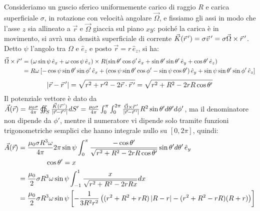 Consideriamo un guscio sferico uniformemente carico di raggio $ R $ e carica superficiale $ \sigma $, in rotazione con velocità angolare $ \vec{\Omega} $, e fissiamo gli assi in modo che l'asse $ z $ sia allineato a $ \vec{r} $ e $ \vec{\Omega} $ giaccia sul piano $ xy $: poiché la carica è in movimento, si avrà una densità superficiale di corrente $ \vec{K}(\vec{r}\,') = \sigma\vec{v}\,' = \sigma\vec{\Omega}\times\vec{r}\,' $. \\ 
%
Detto $ \psi $ l'angolo tra $ \Omega $ e $ \hat{e}_z $ e posto $ \vec{r} = r\,\hat{e}_z $, si ha:
\begin{equation}
	\begin{split}
		\vec{\Omega}\times\vec{r}\,' &= (\omega \sin\psi \,\hat{e}_x + \omega \cos\psi \,\hat{e}_z) \times R (\sin\theta'\cos\phi' \,\hat{e}_x + \sin\theta'\sin\theta' \,\hat{e}_y + \cos\theta' \,\hat{e}_z) \\ 
				     &= R\omega \left[-\cos\psi\sin\theta'\sin\phi' \,\hat{e}_x + (\cos\psi\sin\theta'\cos\phi' - \sin\psi\cos\theta')\,\hat{e}_y + \sin\psi\sin\theta'\sin\phi' \,\hat{e}_z \right]
	\end{split}
	\label{eq:}
\end{equation}
\begin{equation}
	\left\lvert\vec{r} - \vec{r}\,'\right\rvert = \sqrt{r^2 + r'^2 - 2\vec{r}\cdot\vec{r}\,'} = \sqrt{r^2 + R^2 - 2rR\cos\theta'}
	\label{eq:}
\end{equation}
Il potenziale vettore è dato da $ \vec{A}(\vec{r}) = \frac{\mu_0 \sigma}{4\pi} \oiint_S \frac{\vec{K}(\vec{r}\,')}{\left\lvert\vec{r}-\vec{r}\,'\right\rvert} dS' = \frac{\mu_0 \sigma}{4\pi} \int_0^{\pi} \int_0^{2\pi} \frac{\vec{\Omega}\times\vec{r}\,'}{\left\lvert\vec{r}-\vec{r}\,'\right\rvert} R^2 \sin\theta' d\theta' d\phi' $, ma il denominatore non dipende da $ \phi' $, mentre il numeratore vi dipende solo tramite funzioni trigonometriche semplici che hanno integrale nullo su $ [0,2\pi] $, quindi:
\begin{equation}
	\begin{split}
		\vec{A}(\vec{r}) &= \displaystyle\frac{\mu_0 \sigma R^3 \omega}{4\pi} 2\pi\sin\psi \int_0^{\pi} \displaystyle\frac{-\cos\theta'}{\sqrt{r^2 + R^2 -2rR\cos\theta'}} \sin\theta' d\theta' \,\hat{e}_y \\ 
				 & \qquad\qquad \cos\theta' = x \\ 
				 &= \displaystyle\frac{\mu_0}{2} \sigma R^3 \omega \sin\psi \int_{-1}^{1} \displaystyle\frac{x}{\sqrt{r^2 + R^2 - 2rRx}} dx \\ 
				 &= \displaystyle\frac{\mu_0}{2} \sigma R^3 \omega \sin\psi \left[ -\displaystyle\frac{1}{3R^2r^2}\left( (r^2 + R^2 + rR)\left\lvert R - r\right\rvert - (r^2 + R^2 - rR)(R + r)\right)\right]
	\end{split}
	\label{eq:}
\end{equation}
